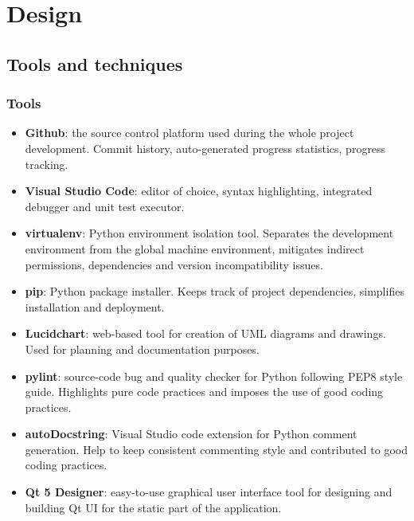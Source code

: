 \section{Design}

\subsection{Tools and techniques}

\subsubsection{Tools}
\begin{itemize}
	\item \textbf{Github}: the source control platform used during the whole project development. Commit history, auto-generated progress statistics, progress tracking.
	\item \textbf{Visual Studio Code}: editor of choice, syntax highlighting, integrated debugger and unit test executor.
	\item \textbf{virtualenv}: Python environment isolation tool. Separates the development environment from the global machine environment, mitigates indirect permissions, dependencies and version incompatibility issues.
	\item \textbf{pip}: Python package installer. Keeps track of project dependencies, simplifies installation and deployment.
	\item \textbf{Lucidchart}: web-based tool for creation of UML diagrams and drawings. Used for planning and documentation purposes. 
	\item \textbf{pylint}: source-code bug and quality checker for Python following PEP8 style guide\cite{pep8}. Highlights pure code practices and imposes the use of good coding practices.
	\item \textbf{autoDocstring}: Visual Studio code extension for Python comment generation. Help to keep consistent commenting style and contributed to good coding practices.
	\item \textbf{Qt 5 Designer}: easy-to-use graphical user interface tool for designing and building Qt UI for the static part of the application.
\end{itemize}

